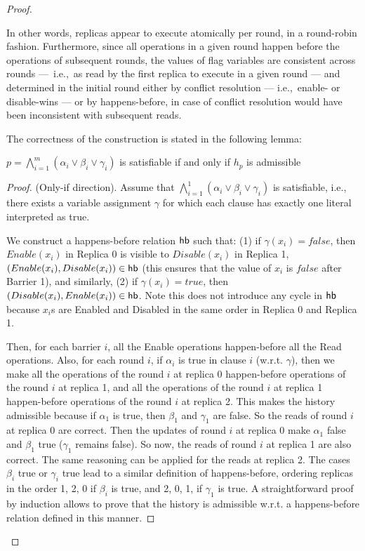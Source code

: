 \begin{proof}
\begin{enumerate}
\vspace{-1.5mm}
  \end{enumerate}

  In other words, replicas appear to execute atomically per round, in a round-robin fashion. Furthermore, since all operations in a given round happen before the operations of subsequent rounds, the values of flag variables are consistent across rounds — i.e.,~as read by the first replica to execute in a given round — and determined in the initial round either by conflict resolution — i.e.,~enable- or disable-wins — or by happens-before, in case of conflict resolution would have been inconsistent with subsequent reads.

The correctness of the construction is stated in the following lemma:
  
  \begin{lemma}
    \label{crdt:flag:npc-proof:lemma3}
    $p = \bigwedge_{i=1}^{m} (\alpha_i \lor \beta_i \lor \gamma_i)$ is satisfiable if and only if $h_p$ is admissible
  \end{lemma}
  
  \begin{proof}
    (Only-if direction). 
    Assume that $\bigwedge_{i=1}^{1} (\alpha_i \lor \beta_i \lor \gamma_i)$ is satisfiable, i.e., there exists a variable assignment $\gamma$ for which each clause has exactly one literal interpreted as true. 
    
    We construct a happens-before relation $\textsf{hb}$ such that: (1) if $\gamma(x_i) = false$, then $Enable(x_i)$ in Replica 0 is visible to $Disable(x_i)$ in Replica 1, \ie $(Enable(x_i), Disable(x_i)) \in \textsf{hb}$ (this ensures that the value of $x_i$ is $false$ after Barrier 1), and similarly, (2) if $\gamma(x_i) = true$, then $(Disable(x_i), Enable(x_i)) \in \textsf{hb}$. Note this does not introduce any cycle in $\textsf{hb}$ because $x_i$s are \textrm{Enable}d and \textrm{Disable}d in the same order in Replica 0 and Replica 1.

    Then, for each barrier $i$, all the \textrm{Enable} operations happen-before all the \textrm{Read} operations. Also, for each round $i$, if $\alpha_i$ is true in clause $i$ (w.r.t. $\gamma$), then we make all the operations of the round $i$ at replica 0 happen-before operations of the round $i$ at replica 1, and all the operations of the round $i$ at replica 1 happen-before operations of the round $i$ at replica 2. This makes the history admissible because if $\alpha_1$ is true, then $\beta_1$ and $\gamma_1$ are false. So the reads of round $i$ at replica 0 are correct. Then the updates of round $i$ at replica 0 make $\alpha_1$ false and $\beta_1$ true ($\gamma_1$ remains false). So now, the reads of round $i$ at replica 1 are also correct. The same reasoning can be applied for the reads at replica 2. The cases $\beta_i$ true or $\gamma_i$ true lead to a similar definition of happens-before, ordering replicas in the order 1, 2, 0 if $\beta_i$ is true, and 2, 0, 1, if $\gamma_1$ is true. A straightforward proof by induction allows to prove that the history is admissible w.r.t. a happens-before relation defined in this manner.
    

\end{proof}
\end{proof}
